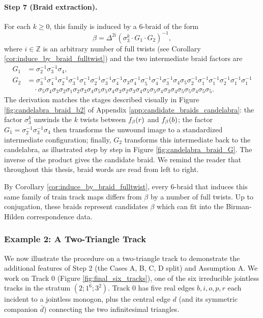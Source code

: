 \paragraph{Step 7 (Braid extraction).} For each $k \geq 0$, this family is induced by a 6-braid of the form
\[
\beta = \Delta^{2i} (\sigma_3^k \cdot G_1 \cdot G_2)^{-1},
\]
where $i \in \mathbb{Z}$ is an arbitrary number of full twists (see Corollary \ref{cor:induce_by_braid_fulltwist}) and the two intermediate braid factors are
\begin{align*}
G_1 &= \sigma_2^{-1}\sigma_3^{-1}\sigma_4, \\
G_2 &= \sigma_{3}^{-1}\sigma_{4}^{-1}\sigma_{2}^{-1}\sigma_{3}^{-1}\sigma_{1}^{-1}\sigma_{2}^{-1}\sigma_{3}^{-1}\sigma_{4}^{-1}\sigma_{3}\sigma_{4}^{-1}\sigma_{5}^{-1}\sigma_{4}^{-1}\sigma_{3}^{-1}\sigma_{4}\sigma_{5}\sigma_{2}^{-1}\sigma_{1}^{-1}\sigma_{1}^{-1}\sigma_{2}^{-1}\sigma_{1}^{-1}\sigma_{1}^{-1} \\
&\quad \cdot \sigma_{5}\sigma_{4}\sigma_{3}\sigma_{2}\sigma_{1}\sigma_{2}\sigma_{3}\sigma_{4}\sigma_{5}\sigma_{5}\sigma_{4}\sigma_{3}\sigma_{2}\sigma_{3}\sigma_{4}\sigma_{5}\sigma_{5}\sigma_{4}\sigma_{3}\sigma_{4}\sigma_{5}\sigma_{5}\sigma_{4}\sigma_{5}\sigma_{5}.
\end{align*}
The derivation matches the stages described visually in Figure \ref{fig:candelabra_braid_b2} of Appendix \ref{app:candidate_braids_candelabra}: the factor $\sigma_3^k$ unwinds the $k$ twists between $f_\beta(r)$ and $f_\beta(b)$; the factor $G_1 = \sigma_2^{-1}\sigma_3^{-1}\sigma_4$ then transforms the unwound image to a standardized intermediate configuration; finally, $G_2$ transforms this intermediate back to the candelabra, as illustrated step by step in Figure \ref{fig:candelabra_braid_G}. The inverse of the product gives the candidate braid. We remind the reader that throughout this thesis, braid words are read from left to right.

By Corollary \ref{cor:induce_by_braid_fulltwist}, every 6-braid that induces this same family of train track maps differs from $\beta$ by a number of full twists. Up to conjugation, these braids represent candidates $\beta$ which can fit into the Birman-Hilden correspondence data.

\subsubsection*{Example 2: A Two-Triangle Track}
\label{subsec:example_two_triangles}

We now illustrate the procedure on a two-triangle track to demonstrate the additional features of Step 2 (the Cases A, B, C, D split) and Assumption A. We work on Track 0 (Figure \ref{fig:final_six_tracks}), one of the six irreducible jointless tracks in the stratum $(2;1^6;3^2)$. Track 0 has five real edges $b, i, o, p, r$ each incident to a jointless monogon, plus the central edge $d$ (and its symmetric companion $\bar{d}$) connecting the two infinitesimal triangles.

